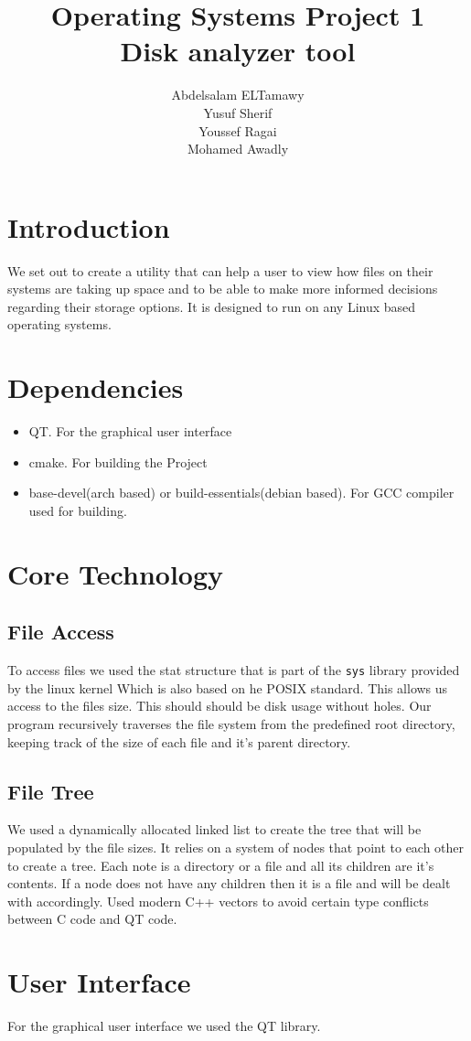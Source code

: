 \documentclass[]{article}
\author{Abdelsalam ELTamawy\\Yusuf Sherif\\Youssef Ragai\\Mohamed Awadly}
\title{Operating Systems Project 1\\Disk analyzer tool}
\begin{document}
    \begin{titlepage}

        \maketitle
    \end{titlepage}

    \section{Introduction}
    We set out to create a utility that can help a user to view how files on their systems are taking up space and to be able to make more informed decisions regarding their storage options.
    It is designed to run on any Linux based operating systems.

    \section{Dependencies}
    \begin{itemize}
        \item QT. For the graphical user interface
        \item cmake. For building the Project
        \item base-devel(arch based) or build-essentials(debian based). For GCC compiler used for building.
    \end{itemize}

    \section{Core Technology}
    \subsection{File Access}
    To access files we used the stat structure that is part of the \texttt{sys} library provided by the linux kernel Which is also based on he POSIX standard.
    This allows us access to the files size. This should should be disk usage without holes. Our program recursively traverses the file system from the predefined root directory, keeping track of the size of each file and it's parent directory.

    \subsection{File Tree}
    We used a dynamically allocated linked list to create the tree that will be populated by the file sizes. It relies on a system of nodes that point to each other to create a tree. Each note is a directory or a file and all its children are it's contents.
    If a node does not have any children then it is a file and will be dealt with accordingly. Used modern C++ vectors to avoid certain type conflicts between C code and QT code.

    \section{User Interface}
    For the graphical user interface we used the QT library.
\end{document}
